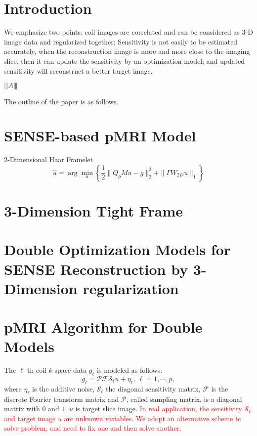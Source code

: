 \documentclass[preprint]{elsarticle}
\newcommand{\vertiii}[1]{{\left\vert\kern-0.25ex\left\vert\kern-0.25ex\left\vert #1
    \right\vert\kern-0.25ex\right\vert\kern-0.25ex\right\vert}}
\newcommand{\tr}[1]{\textcolor{red}{#1}}
\begin{document}
\begin{frontmatter}
\end{frontmatter}


\section{Introduction}
We emphasize two points: coil images are correlated and can be considered as 3-D image data and regularized together; Sensitivity is not easily to be estimated accurately, when the reconstruction image is more and more close to the imaging slice, then it can update the sensitivity  by an optimization model; and updated sensitivity will reconstruct a better target image.


 $\vertiii{A}$


The outline of the paper is as follows.
\section{SENSE-based pMRI Model}

2-Dimensional Haar Framelet \cite{Li-Chan-Shen:SIAMIS:16} \cite{Ye-Chen-Huang:IEEETMI:11}
\begin{equation}\label{mod:SENSE-ObsModel_2DReg}
\hat{u}=\arg\min_{u}\left\{ \frac{1}{2}\| Q_{p}Mu-g \|_{2}^{2}+\| \Gamma W_{2D}u\| _{1}\right\}
\end{equation}

\section{3-Dimension Tight Frame}

\section{Double Optimization Models for SENSE Reconstruction  by 3-Dimension regularization}


\section{pMRI Algorithm for Double Models}

The $\ell$-th  coil $k$-space data $g_\ell$  is modeled as follows:
\begin{equation*}\label{eq:SENSE-ObsModel}
       g_\ell = \mathcal{P}\mathcal{F}\mathcal{S}_\ell u + \eta_\ell,\: \ell =1,\cdots, p,
\end{equation*}
where $\eta_\ell$ is the additive noise, $\mathcal{S}_\ell$ the diagonal sensitivity matrix, $\mathcal{F}$ is the discrete Fourier transform matrix  and
$\mathcal{P}$, called sampling matrix,  is a diagonal matrix with $0$ and $1$, $u$ is target slice image.
\tr{In real application, the sensitivity $\mathcal{S}_\ell$  and target image $u$ are unknown variables. We adopt an alternative scheme to solve problem, and need to fix one and then solve another.}
\end{document}
